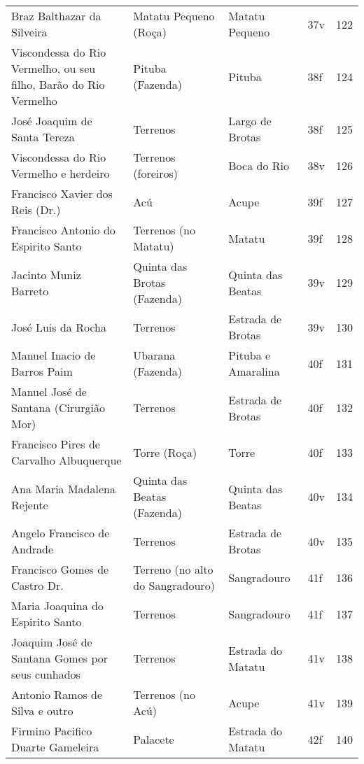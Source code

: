 \begin{table}[ht]
{\begin{minipage}{\textwidth}
\begin{tiny}
\begin{tabular}{p{4cm}p{4cm}p{4cm}ll}
Braz Balthazar da Silveira							&Matatu Pequeno (Roça)			&Matatu Pequeno				&37v			&122			\\
Viscondessa do Rio Vermelho, ou seu filho, Barão do Rio Vermelho		&Pituba (Fazenda)			&Pituba					&38f			&124			\\
José Joaquim de Santa Tereza							&Terrenos				&Largo de Brotas			&38f			&125			\\
Viscondessa do Rio Vermelho e herdeiro						&Terrenos (foreiros)			&Boca do Rio				&38v			&126			\\
Francisco Xavier dos Reis (Dr.)							&Acú					&Acupe					&39f			&127			\\
Francisco Antonio do Espirito Santo						&Terrenos (no Matatu)			&Matatu					&39f			&128			\\
Jacinto Muniz Barreto								&Quinta das Brotas (Fazenda)		&Quinta das Beatas			&39v			&129			\\
José Luis da Rocha								&Terrenos				&Estrada de Brotas					&39v			&130			\\
Manuel Inacio de Barros Paim							&Ubarana (Fazenda)			&Pituba e Amaralina			&40f			&131			\\
Manuel José de Santana (Cirurgião Mor)						&Terrenos				&Estrada de Brotas					&40f			&132			\\
Francisco Pires de Carvalho Albuquerque						&Torre (Roça)				&Torre					&40f			&133			\\
Ana Maria Madalena Rejente							&Quinta das Beatas (Fazenda)		&Quinta das Beatas			&40v			&134			\\
Angelo Francisco de Andrade							&Terrenos				&Estrada de Brotas					&40v			&135			\\
Francisco Gomes de Castro Dr.							&Terreno (no alto do Sangradouro)	&Sangradouro				&41f			&136			\\
Maria Joaquina do Espirito Santo						&Terrenos				&Sangradouro					&41f			&137			\\
Joaquim José de Santana Gomes por seus cunhados					&Terrenos				&Estrada do Matatu					&41v			&138			\\
Antonio Ramos de Silva e outro							&Terrenos (no Acú)			&Acupe					&41v			&139			\\
Firmino Pacifico Duarte Gameleira						&Palacete				&Estrada do Matatu					&42f			&140			\\
\bottomrule
\end{tabular} 
\end{tiny}
\end{minipage}
}
{}
\end{table}
